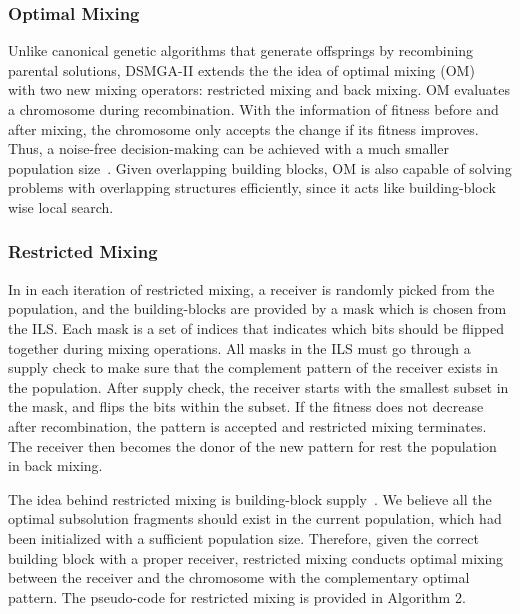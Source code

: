\documentclass{sig-alternate-05-2015}
\begin{document}
\subsubsection{Optimal Mixing}
Unlike canonical genetic algorithms that generate offsprings by recombining parental solutions, DSMGA-II extends the the idea of optimal mixing (OM)~\cite{thierens:OM} with two new mixing operators: restricted mixing and back mixing. OM evaluates a chromosome during recombination. With the information of fitness before and after mixing, the chromosome only accepts the change if its fitness improves. Thus, a noise-free decision-making can be achieved with a much smaller population size~\cite{goldberg:buildingblock}. Given overlapping building blocks, OM is also capable of solving problems with overlapping structures efficiently, since it acts like building-block wise local search.


\subsubsection{Restricted Mixing}

In in each iteration of restricted mixing, a receiver is randomly picked from the population, and the building-blocks are provided by a mask which is chosen from the ILS. Each mask is a set of indices that indicates which bits should be flipped together during mixing operations. All masks in the ILS must go through a supply check to make sure that the complement pattern of the receiver exists in the population.  After supply check, the receiver starts with the smallest subset in the mask, and flips the bits within the subset. If the fitness does not decrease after recombination, the pattern is accepted and restricted mixing terminates. The receiver then becomes the donor of the new pattern for rest the population in back mixing. 


The idea behind restricted mixing is building-block supply~\cite{goldberg:buildingblock}. We believe all the optimal subsolution fragments should exist in the current population, which had been initialized with a sufficient population size. Therefore, given the correct building block with a proper receiver, restricted mixing conducts optimal mixing between the receiver and the chromosome with the complementary optimal pattern. The pseudo-code for  restricted mixing is provided in Algorithm 2.
\end{document}
